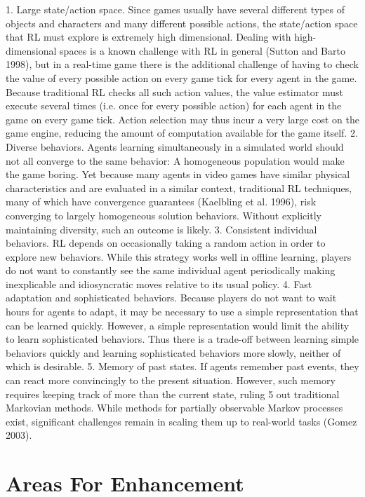 \documentclass[a4paper,oneside]{report}
\begin{document}
1. Large state/action space. Since games usually have several different types of objects and characters and many different possible actions, the state/action space that RL must explore is extremely high dimensional. Dealing with high-dimensional spaces is a known challenge with RL in general (Sutton and Barto 1998), but in a real-time game there is the additional challenge of having to check the value of every possible action on every game tick for every agent in the game. Because traditional RL checks all such action values, the value estimator must execute several times (i.e. once for every possible action) for each agent in the game on every game tick. Action selection may thus incur a very large cost on the game engine, reducing the amount of computation available for the game itself.
2. Diverse behaviors. Agents learning simultaneously in a simulated world should not all converge to the same behavior: A homogeneous population would make the game boring. Yet because many agents in video games have similar physical characteristics and are evaluated in a similar context, traditional RL techniques, many of which have convergence guarantees (Kaelbling et al. 1996), risk converging to largely homogeneous solution behaviors. Without explicitly maintaining diversity, such an outcome is likely.
3. Consistent individual behaviors. RL depends on occasionally taking a random action in order to explore new behaviors. While this strategy works well in offline learning, players do not want to constantly see the same individual agent periodically making inexplicable and idiosyncratic moves relative to its usual policy.
4. Fast adaptation and sophisticated behaviors. Because players do not want to wait hours for agents to adapt, it may be necessary to use a simple representation that can be learned quickly. However, a simple representation would limit the ability to learn sophisticated behaviors. Thus there is a trade-off between learning simple behaviors quickly and learning sophisticated behaviors more slowly, neither of which is desirable.
5. Memory of past states. If agents remember past events, they can react more convincingly to the present situation. However, such memory requires keeping track of more than the current state, ruling
5
out traditional Markovian methods. While methods for partially observable Markov processes exist, significant challenges remain in scaling them up to real-world tasks (Gomez 2003).

\section{Areas For Enhancement}
\end{document}
